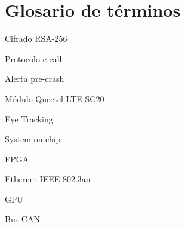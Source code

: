 \section{Glosario de términos}

\begin{description}

  \item{Cifrado RSA-256}
  \item{Protocolo e-call}
  \item{Alerta pre-crash}
  \item{Módulo Quectel LTE SC20}
  \item{Eye Tracking}
  \item{System-on-chip}
  \item{FPGA}
  \item{Ethernet} IEEE 802.3an
  \item{GPU}
  \item{Bus CAN}

\end{description}
